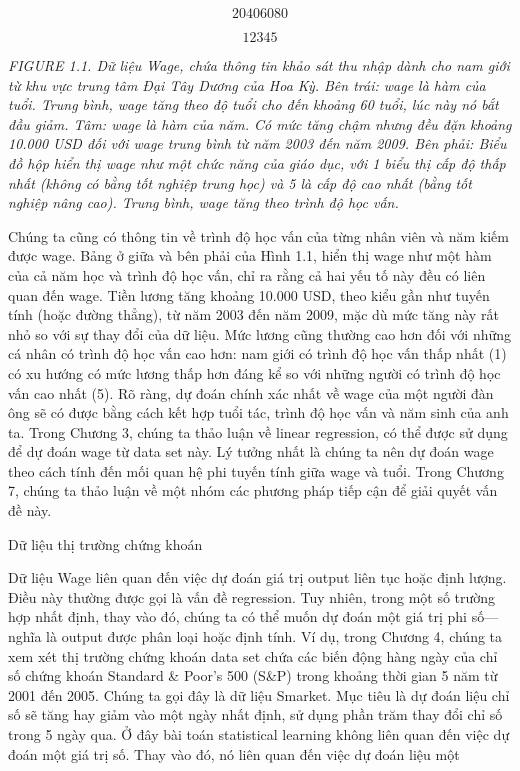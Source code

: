 \[20 40 60 80\]

\[1 2 3 4 5\]

\noindent\textit{FIGURE 1.1. Dữ liệu Wage, chứa thông tin khảo sát thu nhập dành cho nam giới từ khu vực trung tâm Đại Tây Dương của Hoa Kỳ. Bên trái: wage là hàm của tuổi. Trung bình, wage tăng theo độ tuổi cho đến khoảng 60 tuổi, lúc này nó bắt đầu giảm. Tâm: wage là hàm của năm. Có mức tăng chậm nhưng đều đặn khoảng 10.000 USD đối với wage trung bình từ năm 2003 đến năm 2009. Bên phải: Biểu đồ hộp hiển thị wage như một chức năng của giáo dục, với 1 biểu thị cấp độ thấp nhất (không có bằng tốt nghiệp trung học) và 5 là cấp độ cao nhất (bằng tốt nghiệp nâng cao). Trung bình, wage tăng theo trình độ học vấn.}

Chúng ta cũng có thông tin về trình độ học vấn của từng nhân viên và năm kiếm được wage. Bảng ở giữa và bên phải của Hình 1.1, hiển thị wage như một hàm của cả năm học và trình độ học vấn, chỉ ra rằng cả hai yếu tố này đều có liên quan đến wage. Tiền lương tăng khoảng 10.000 USD, theo kiểu gần như tuyến tính (hoặc đường thẳng), từ năm 2003 đến năm 2009, mặc dù mức tăng này rất nhỏ so với sự thay đổi của dữ liệu. Mức lương cũng thường cao hơn đối với những cá nhân có trình độ học vấn cao hơn: nam giới có trình độ học vấn thấp nhất (1) có xu hướng có mức lương thấp hơn đáng kể so với những người có trình độ học vấn cao nhất (5). Rõ ràng, dự đoán chính xác nhất về wage của một người đàn ông sẽ có được bằng cách kết hợp tuổi tác, trình độ học vấn và năm sinh của anh ta. Trong Chương 3, chúng ta thảo luận về linear regression, có thể được sử dụng để dự đoán wage từ data set này. Lý tưởng nhất là chúng ta nên dự đoán wage theo cách tính đến mối quan hệ phi tuyến tính giữa wage và tuổi. Trong Chương 7, chúng ta thảo luận về một nhóm các phương pháp tiếp cận để giải quyết vấn đề này.

Dữ liệu thị trường chứng khoán

Dữ liệu Wage liên quan đến việc dự đoán giá trị output liên tục hoặc định lượng. Điều này thường được gọi là vấn đề regression. Tuy nhiên, trong một số trường hợp nhất định, thay vào đó, chúng ta có thể muốn dự đoán một giá trị phi số—nghĩa là output được phân loại hoặc định tính. Ví dụ, trong Chương 4, chúng ta xem xét thị trường chứng khoán data set chứa các biến động hàng ngày của chỉ số chứng khoán Standard \& Poor's 500 (S\&P) trong khoảng thời gian 5 năm từ 2001 đến 2005. Chúng ta gọi đây là dữ liệu Smarket. Mục tiêu là dự đoán liệu chỉ số sẽ tăng hay giảm vào một ngày nhất định, sử dụng phần trăm thay đổi chỉ số trong 5 ngày qua. Ở đây bài toán statistical learning không liên quan đến việc dự đoán một giá trị số. Thay vào đó, nó liên quan đến việc dự đoán liệu một

